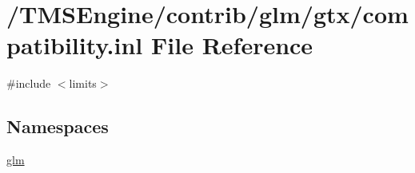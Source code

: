 \hypertarget{compatibility_8inl}{}\section{/\+T\+M\+S\+Engine/contrib/glm/gtx/compatibility.inl File Reference}
\label{compatibility_8inl}
{\ttfamily \#include $<$limits$>$}\newline
\subsection*{Namespaces}
\begin{DoxyCompactItemize}
\item 
 \hyperlink{namespaceglm}{glm}
\end{DoxyCompactItemize}
